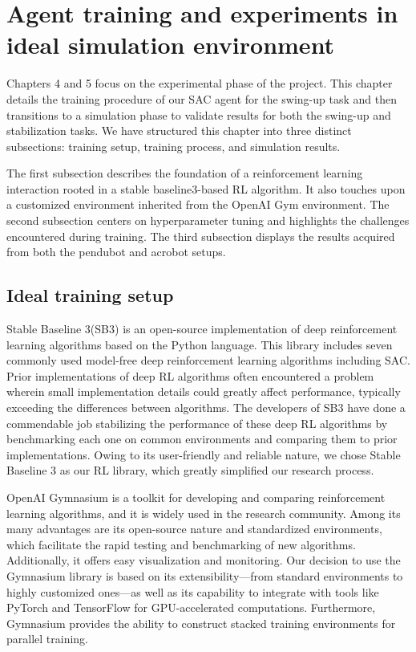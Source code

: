 \chapter{Agent training and experiments in ideal simulation environment}
Chapters 4 and 5 focus on the experimental phase of the project. This chapter details the training procedure of our SAC agent for the swing-up task and then transitions to a simulation phase to validate results for both the swing-up and stabilization tasks. We have structured this chapter into three distinct subsections: training setup, training process, and simulation results.

The first subsection describes the foundation of a reinforcement learning interaction rooted in a stable baseline3-based RL algorithm. It also touches upon a customized environment inherited from the OpenAI Gym environment. The second subsection centers on hyperparameter tuning and highlights the challenges encountered during training. The third subsection displays the results acquired from both the pendubot and acrobot setups.

\section{Ideal training setup}
Stable Baseline 3(SB3)\cite{stable-baselines3} is an open-source implementation of deep reinforcement learning algorithms based on the Python language. This library includes seven commonly used model-free deep reinforcement learning algorithms including SAC. Prior implementations of deep RL algorithms often encountered a problem wherein small implementation details could greatly affect performance, typically exceeding the differences between algorithms\cite{islam2017reproducibility}. The developers of SB3 have done a commendable job stabilizing the performance of these deep RL algorithms by benchmarking each one on common environments and comparing them to prior implementations. Owing to its user-friendly and reliable nature, we chose Stable Baseline 3 as our RL library, which greatly simplified our research process.

OpenAI Gymnasium\cite{towers_gymnasium_2023} is a toolkit for developing and comparing reinforcement learning algorithms, and it is widely used in the research community. Among its many advantages are its open-source nature and standardized environments, which facilitate the rapid testing and benchmarking of new algorithms. Additionally, it offers easy visualization and monitoring. Our decision to use the Gymnasium library is based on its extensibility—from standard environments to highly customized ones—as well as its capability to integrate with tools like PyTorch and TensorFlow for GPU-accelerated computations. Furthermore, Gymnasium provides the ability to construct stacked training environments for parallel training.

